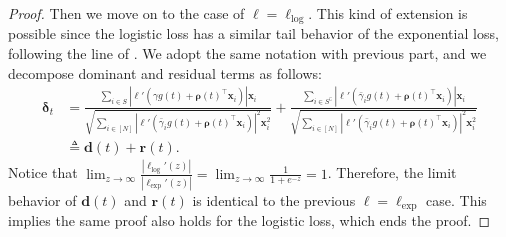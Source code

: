 \documentclass{article} %
\theoremstyle{plain}
\theoremstyle{definition}
\theoremstyle{remark}
\def\bdel{{\boldsymbol \delta}}
\def\bx{{\mathbf x}}
\def\bd{{\mathbf d}}
\begin{document}
\begin{proof}
        Then we move on to the case of $\ell=\ell_{\text{log}}$. This kind of extension is possible since the logistic loss has a similar tail behavior of the exponential loss, following the line of \citet{soudry2018the}. We adopt the same notation with previous part, and we decompose dominant and residual terms as follows:
    \begin{align*}
        \bdel_t &= \frac{\sum_{i \in S} |\ell'(\gamma g(t) + \boldsymbol{\rho}(t)^\top \mathbf{x}_i)| \mathbf{x}_i}{\sqrt{\sum_{i \in [N]}|\ell'(\bar{\gamma}_i g(t)+\boldsymbol{\rho}(t)^\top \mathbf{x}_i)|^2 \mathbf{x}_i^2}} + \frac{\sum_{i \in S^\complement} |\ell'(\bar{\gamma}_i g(t)+\boldsymbol{\rho}(t)^\top \mathbf{x}_i)|\bx_i}{\sqrt{\sum_{i \in [N]}|\ell'(\bar{\gamma}_i g(t)+\boldsymbol{\rho}(t)^\top \mathbf{x}_i)|^2 \mathbf{x}_i^2}} \\ 
        &\triangleq \mathbf{d}(t) + \mathbf{r}(t).
    \end{align*}
    Notice that $\lim_{z \rightarrow \infty} \frac{|\ell_{\text{log}}'(z)|}{|\ell_{\text{exp}}'(z)|}= \lim_{z \rightarrow \infty} \frac{1}{1+e^{-z}}=1$. Therefore, the limit behavior of $\bd(t)$ and $\mathbf{r}(t)$ is identical to the previous $\ell=\ell_{\text{exp}}$ case. This implies the same proof also holds for the logistic loss, which ends the proof.
\end{proof}
\end{document}
